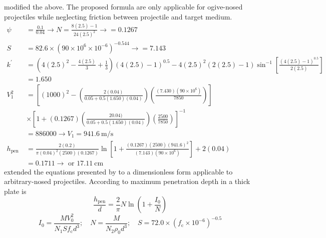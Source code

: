 \documentclass[]{article} %
\begin{document}
\cite{forrestal2003penetration} modified the above. The proposed formula are only applicable for
ogive-nosed projectiles while neglecting friction between projectile and target medium.
\begin{equation}\nonumber
  \begin{aligned}
  \psi & =\frac{0.1}{0.04} \rightarrow N=\frac{8(2.5)-1}{24(2.5)^2} \rightarrow=0.1267 \\
  S & =82.6 \times\left(90 \times 10^6 \times 10^{-6}\right)^{-0.544} \rightarrow=7.143 \\
  k^{\prime} & =\left(4(2.5)^2-\frac{4(2.5)}{3}+\frac{1}{3}\right)(4(2.5)-1)^{0.5}-4(2.5)^2(2(2.5)-1) \sin ^{-1}\left[\frac{(4(2.5)-1)^{0.5}}{2(2.5)}\right] \\
  & =1.650 \\
  V_1^2 & =\left[{(1000)^2-\left(\frac{2(0.04)}{0.05+0.5(1.650)(0.04)}\right)\left(\frac{(7.430)\left(90 \times 10^6\right)}{7850}\right)}\right]\\
 &\times \left[{1+(0.1267)\left(\frac{20.04)}{0.05+0.5(1.650)(0.04)}\right)\left(\frac{2500}{7850}\right)}\right]^{-1} \\
  & =886000 \rightarrow V_1=941.6 \mathrm{~m} / \mathrm{s} \\
  h_{\text {pen }} & =\frac{2(0.2)}{\pi(0.04)^2(2500)(0.1267)} \ln \left[1+\frac{(0.1267)(2500)(941.6)^2}{(7.143)\left(90 \times 10^6\right)}\right]+2(0.04) \\
  & =0.1711 \rightarrow \text { or } 17.11 \mathrm{~cm}
  \end{aligned}
  \end{equation}
\cite{chen2002deep,li2003dimensionless} extended the equations presented by \cite{forrestal1993penetration,forrestal1996penetration} to a dimensionless form applicable to arbitrary-nosed projectiles. According to \cite{chen2002deep,li2003dimensionless} maximum penetration depth in a thick plate is
\begin{equation}\label{eq04}
  \frac{h_{\mathrm{pen}}}{d}=\frac{2}{\pi} N \ln \left(1+\frac{I_0}{N}\right)
  \end{equation}
  \begin{equation}\label{eq05}
    I_0=\frac{M V_0^2}{N_1 S f_{\mathrm{c}} d^3} ; \quad N=\frac{M}{N_2 \rho_0 d^3} ; \quad S=72.0 \times\left(f_{\mathrm{c}} \times 10^{-6}\right)^{-0.5}
    \end{equation}
  
\end{document}
